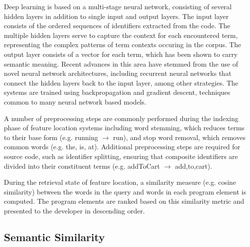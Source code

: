 Deep learning is based on a multi-stage neural network, consisting of
several hidden layers in addition to single input and output layers.
The input layer consists of the ordered sequences of identifiers
extracted from the code. The multiple hidden layers serve to capture
the context for each encountered term, representing the complex
patterns of term contexts occuring in the corpus. The output layer
consists of a vector for each term, which has been shown to carry
semantic meaning. Recent advances in this area have stemmed from the
use of novel neural network architectures, including recurrent neural
networks that connect the hidden layers back to the input layer, among
other strategies. The systems are trained using backpropagation and
gradient descent, techniques common to many neural network based
models.

 
A number of preprocessing steps are commonly performed during the
indexing phase of feature location systems including word stemming,
which reduces terms to their base form (e.g. running $\rightarrow$
run), and stop word removal, which removes common words (e.g. the, is,
at). Additional preprocessing steps are required for source code, such
as identifier splitting, ensuring that composite identifiers are
divided into their constituent terms (e.g. addToCart $\rightarrow$
add,to,cart). 


During the retrieval state of feature location, a similarity measure
(e.g. cosine similarity) between the words in the query and words in
each program element is computed. The program elements are ranked
based on this similarity metric and presented to the developer in
descending order.







\subsection{Semantic Similarity}
